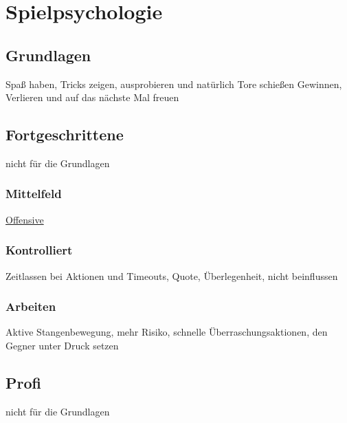 \chapter{Spielpsychologie}
\label{mental}

\section{Grundlagen}
Spaß haben, Tricks zeigen, ausprobieren und natürlich Tore schießen 
Gewinnen, Verlieren und auf das nächste Mal freuen 


\section{Fortgeschrittene}
nicht für die Grundlagen

\subsection{Mittelfeld}
\href{http://ungeblogtkickern.blogspot.de/2016/03/passspiel-3-strategie.html}{Offensive}

\subsection{Kontrolliert}
Zeitlassen bei Aktionen und Timeouts, Quote, Überlegenheit, nicht beinflussen
\subsection{Arbeiten}
Aktive Stangenbewegung, mehr Risiko, schnelle Überraschungsaktionen, den Gegner unter Druck setzen

\section{Profi}
nicht für die Grundlagen
